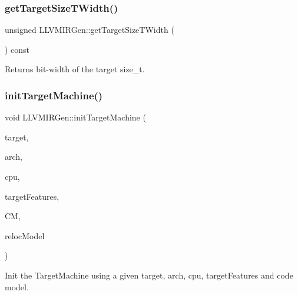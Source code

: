 \subsubsection{\texorpdfstring{get\+Target\+Size\+T\+Width()}{getTargetSizeTWidth()}}
{\footnotesize\ttfamily unsigned L\+L\+V\+M\+I\+R\+Gen\+::get\+Target\+Size\+T\+Width (\begin{DoxyParamCaption}{ }\end{DoxyParamCaption}) const\hspace{0.3cm}{\ttfamily [virtual]}}

\begin{DoxyReturn}{Returns}
bit-\/width of the target size\+\_\+t. 
\end{DoxyReturn}
\mbox{\label{classglow_1_1_l_l_v_m_i_r_gen_a712d537a8810928bb5b6836a3e1b36f6}} 
\subsubsection{\texorpdfstring{init\+Target\+Machine()}{initTargetMachine()}}
{\footnotesize\ttfamily void L\+L\+V\+M\+I\+R\+Gen\+::init\+Target\+Machine (\begin{DoxyParamCaption}\item[{llvm\+::\+String\+Ref}]{target,  }\item[{llvm\+::\+String\+Ref}]{arch,  }\item[{llvm\+::\+String\+Ref}]{cpu,  }\item[{const llvm\+::\+Small\+Vector\+Impl$<$ std\+::string $>$ \&}]{target\+Features,  }\item[{llvm\+::\+Code\+Model\+::\+Model}]{CM,  }\item[{llvm\+::\+Reloc\+::\+Model}]{reloc\+Model }\end{DoxyParamCaption})\hspace{0.3cm}{\ttfamily [virtual]}}

Init the Target\+Machine using a given {\ttfamily target}, {\ttfamily arch}, {\ttfamily cpu}, {\ttfamily target\+Features} and code model. \mbox{\label{classglow_1_1_l_l_v_m_i_r_gen_a6d4377d61d03f0de9c285cf9b0448e8b}} 

